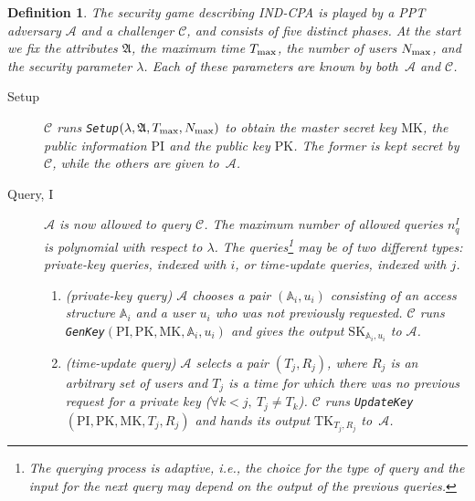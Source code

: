 \documentclass[a4paper,10pt]{article}
\newtheorem{definition}{Definition}
\newcommand{\singlefunction}[1]{\texttt{#1}}
\begin{document}
	\begin{definition} \label{security.def}
		The security game describing IND-CPA is played by a PPT  adversary $\mathcal{A}$ and a challenger $\mathcal{C}$, and consists of five distinct phases. At the start we fix the attributes $\mathfrak{A}$, the maximum time $T_{\textnormal{max}}$, the number of users $N_{\textnormal{max}}$, and the security parameter $\lambda$. Each of these parameters are known by both~$\mathcal{A}$ and $\mathcal{C}$.
		\begin{description}
			\item[Setup]
			$\mathcal{C}$ runs \singlefunction{Setup}$(\lambda,\mathfrak{A},T_{\textnormal{max}},N_{\textnormal{max}})$ to obtain the master secret key $\mathit{\mathrm{MK}}$, the public information $\mathit{\mathrm{PI}}$ and the public key $\mathit{\mathrm{PK}}$. The former is kept secret by $\mathcal{C}$, while the others are given to~$\mathcal{A}$.
			
			\item[Query, I]
			$\mathcal{A}$ is now allowed to query $\mathcal{C}$. The maximum number of allowed queries $n_q^{I}$ is polynomial with respect to $\lambda$.
			The queries\footnote{The querying process is adaptive, i.e., the choice for the type of query and the input for the next query may depend on the output of the previous queries. } may be of two different types: private-key queries,  indexed with $i$, or time-update queries, indexed with $j$. 
			\begin{enumerate}
				\item
				(private-key query)
				$\mathcal{A}$ chooses a pair $(\mathbb{A}_i,u_i)$ consisting of an access \linebreak{} structure $\mathbb{A}_i$ and a user $u_i$ who was not previously requested. 
				$\mathcal{C}$ runs \singlefunction{GenKey}$(\mathit{\mathrm{PI}},\mathit{\mathrm{PK}},\mathit{\mathrm{MK}},\mathbb{A}_i,u_i)$ and gives the output $\mathit{\mathrm{SK}}_{\mathbb{A}_i,u_i}$ to $\mathcal{A}$.
				\item
				(time-update query)
				$\mathcal{A}$ selects a pair $(T_j,R_j)$, where $R_j$ is an arbitrary set of users and $T_j$ is a time for which there was no previous request for a private key (${\forall k < j,}\: {T_j\neq T_{k}}$).
				$\mathcal{C}$ runs \singlefunction{UpdateKey}$(\mathit{\mathrm{PI}},\mathit{\mathrm{PK}},\mathit{\mathrm{MK}},T_j,R_j)$ and hands its output 
				$\mathit{\mathrm{TK}}_{T_j,R_j}$ 
				to~$\mathcal{A}$.
			\end{enumerate}
			

\end{description}
\end{definition}
\end{document}
